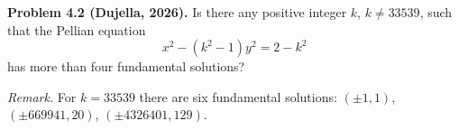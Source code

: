\textbf{Problem 4.2 (Dujella, 2026).} Is there any positive integer $k$, $k \neq 33539$, such that the Pellian equation
\[
x^2-(k^2-1)y^2=2-k^2
\]
has more than four fundamental solutions?

\medskip

\textit{Remark.} For $k=33539$ there are six fundamental solutions: $(\pm 1,1)$, $(\pm 669941,20)$, $(\pm 4326401,129)$.
